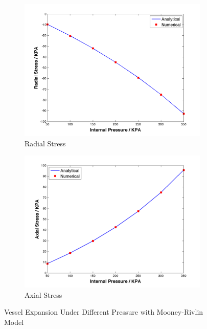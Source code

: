 \begin{figure}[H]
	\begin{subfigure}[b]{0.5\textwidth}
		\centering
		\includegraphics[width=\textwidth]{./figures/radial.png}
		\caption{Radial Stress}
		\label{radial}
	\end{subfigure}
	\begin{subfigure}[b]{0.5\textwidth}
		\centering
		\includegraphics[width=\textwidth]{./figures/axial.png}
		\caption{Axial Stress}
		\label{axial}
	\end{subfigure}
	\caption{Vessel Expansion Under Different Pressure with Mooney-Rivlin Model}
	\label{fig:mooney-rivlin2}
\end{figure}

